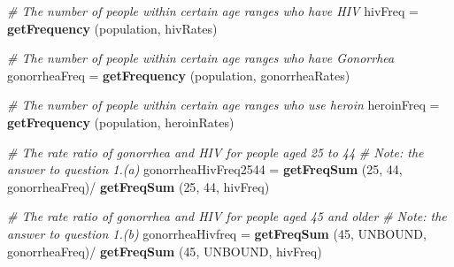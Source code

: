 \documentclass[]{article}
\newenvironment{Shaded}{}{}
\newcommand{\CommentTok}[1]{\textcolor[rgb]{0.38,0.63,0.69}{\textit{#1}}}
\newcommand{\DecValTok}[1]{\textcolor[rgb]{0.25,0.63,0.44}{#1}}
\newcommand{\KeywordTok}[1]{\textcolor[rgb]{0.00,0.44,0.13}{\textbf{#1}}}
\newcommand{\NormalTok}[1]{#1}
\newcommand{\OperatorTok}[1]{\textcolor[rgb]{0.40,0.40,0.40}{#1}}
\newcommand{\StringTok}[1]{\textcolor[rgb]{0.25,0.44,0.63}{#1}}
\begin{document}
\begin{Shaded}
\begin{Highlighting}[]
\CommentTok{# The number of people within certain age ranges who have HIV }
\NormalTok{hivFreq =}\StringTok{ }\KeywordTok{getFrequency}\NormalTok{ (population, hivRates)}

\CommentTok{# The number of people within certain age ranges who have Gonorrhea}
\NormalTok{gonorrheaFreq =}\StringTok{ }\KeywordTok{getFrequency}\NormalTok{ (population, gonorrheaRates)}

\CommentTok{# The number of people within certain age ranges who use heroin}
\NormalTok{heroinFreq =}\StringTok{ }\KeywordTok{getFrequency}\NormalTok{ (population, heroinRates)}

\CommentTok{# The rate ratio of gonorrhea and HIV for people aged 25 to 44}
\CommentTok{# Note: the answer to question 1.(a)}
\NormalTok{gonorrheaHivFreq2544 =}
\StringTok{  }\KeywordTok{getFreqSum}\NormalTok{ (}\DecValTok{25}\NormalTok{, }\DecValTok{44}\NormalTok{, gonorrheaFreq)}\OperatorTok{/}
\StringTok{  }\KeywordTok{getFreqSum}\NormalTok{ (}\DecValTok{25}\NormalTok{, }\DecValTok{44}\NormalTok{, hivFreq)}

\CommentTok{# The rate ratio of gonorrhea and HIV for people aged 45 and older}
\CommentTok{# Note: the answer to question 1.(b)}
\NormalTok{gonorrheaHivfreq =}
\StringTok{  }\KeywordTok{getFreqSum}\NormalTok{ (}\DecValTok{45}\NormalTok{, UNBOUND, gonorrheaFreq)}\OperatorTok{/}
\StringTok{  }\KeywordTok{getFreqSum}\NormalTok{ (}\DecValTok{45}\NormalTok{, UNBOUND, hivFreq)}
\end{Highlighting}
\end{Shaded}
\end{document}
